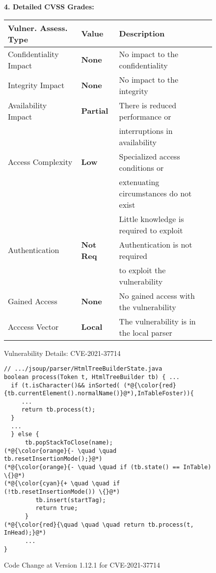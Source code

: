 \begin{figure}[t]
\begin{flushleft}
{\bf 4. Detailed CVSS Grades:}\\
\end{flushleft}
  \centering
  \tabcolsep 3pt
  \footnotesize
  \begin{tabular}{lll}
   Vulner. Assess. Type   & Value & Description \\
      \hline
    Confidentiality Impact & {\bf None}  & No impact to the confidentiality \\
    Integrity Impact & {\bf None}  & No impact to the integrity \\
    Availability Impact & {\bf Partial} & There is reduced performance or\\
    & & interruptions in availability\\
    Access Complexity & {\bf Low} & Specialized access conditions or \\
    & & extenuating circumstances do not exist\\
    & & Little knowledge is required to exploit\\
    Authentication & {\bf Not Req} & Authentication is not required \\
    & & to exploit the vulnerability\\
    Gained Access & {\bf None}  & No gained access with the vulnerability \\
    Acccess Vector & {\bf Local} & The vulnerability is in the local parser \\
    \end{tabular}%
  \label{CVSS:tab}%
\caption{Vulnerability Details: CVE-2021-37714}
\label{CVSS-tab}
\end{figure}

\begin{figure}[t]
	\centering
	\begin{lstlisting}[]
// .../jsoup/parser/HtmlTreeBuilderState.java
boolean process(Token t, HtmlTreeBuilder tb) { ...
  if (t.isCharacter()&& inSorted( (*@{\color{red}{tb.currentElement().normalName()}@*),InTableFoster)){
     ...
     return tb.process(t);
  }
  ...
  } else {
      tb.popStackToClose(name);
(*@{\color{orange}{- \quad \quad tb.resetInsertionMode();}@*)
(*@{\color{orange}{- \quad \quad if (tb.state() == InTable) \{}@*)
(*@{\color{cyan}{+ \quad \quad if (!tb.resetInsertionMode()) \{}@*)
         tb.insert(startTag);
         return true;
      }
(*@{\color{red}{\quad \quad \quad return tb.process(t, InHead);}@*)
      ...
}
	\end{lstlisting}
        \vspace{-15pt}
        \caption{Code Change at Version 1.12.1 for CVE-2021-37714}
        \vspace{-6pt}
        \label{fig:motiv-code}
\end{figure}

